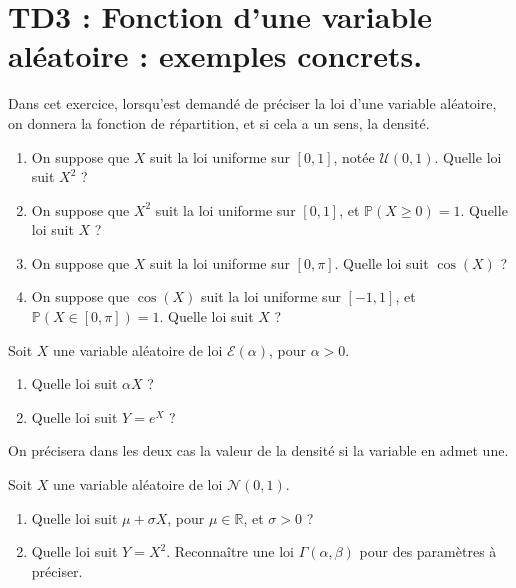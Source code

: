 \chapter*{TD3 :  Fonction d'une variable aléatoire : exemples concrets.}

\setcounter{exercice}{0}

\begin{mdframed}
\begin{exercice}
Dans cet exercice, lorsqu'est demandé de préciser la loi d'une variable aléatoire, on donnera la fonction de répartition, et si cela a un sens, la densité.

\begin{enumerate}
    \item On suppose que $X$ suit la loi uniforme sur $[0, 1]$, notée $\mathcal{U}(0, 1)$. Quelle loi suit $X^2$ ?
    \item On suppose que $X^2$ suit la loi uniforme sur $[0, 1]$, et $\mathbb{P}(X \geq 0) = 1$. Quelle loi suit $X$ ?
    \item On suppose que $X$ suit la loi uniforme sur $[0, \pi]$. Quelle loi suit $\cos(X)$ ?
    \item On suppose que $\cos(X)$ suit la loi uniforme sur $[-1, 1]$, et $\mathbb{P}(X \in [0, \pi]) = 1$. Quelle loi suit $X$ ?
\end{enumerate}
\end{exercice}
\end{mdframed}

\medskip

\begin{mdframed}
\begin{exercice}
Soit $X$ une variable aléatoire de loi $\mathcal{E}(\alpha)$, pour $\alpha > 0$.

\begin{enumerate}
    \item Quelle loi suit $\alpha X$ ?
    \item Quelle loi suit $Y = e^X$ ?
\end{enumerate}

On précisera dans les deux cas la valeur de la densité si la variable en admet une.
\end{exercice}
\end{mdframed}

\medskip

\begin{mdframed}
\begin{exercice}
Soit $X$ une variable aléatoire de loi $\mathcal{N}(0, 1)$.

\begin{enumerate}
    \item Quelle loi suit $\mu + \sigma X$, pour $\mu \in \mathbb{R}$, et $\sigma > 0$ ?
    \item Quelle loi suit $Y = X^2$. Reconnaître une loi $\Gamma(\alpha, \beta)$ pour des paramètres à préciser.
\end{enumerate}
\end{exercice}
\end{mdframed}

